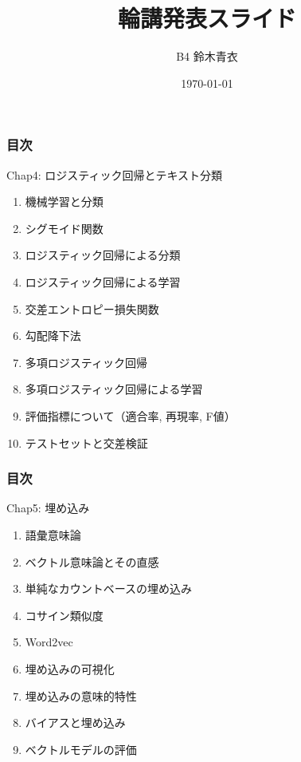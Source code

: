 \documentclass[unicode,11pt]{beamer} %
\title{輪講発表スライド}
\author{B4 鈴木青衣}
\date{\today}
\begin{document}
\begin{frame}
    \maketitle
\end{frame}

\begin{frame}
    \frametitle{目次}
    \begin{block}{Chap4: ロジスティック回帰とテキスト分類}
        \begin{enumerate}
            \item 機械学習と分類
            \item シグモイド関数
            \item ロジスティック回帰による分類
            \item ロジスティック回帰による学習
            \item 交差エントロピー損失関数
            \item 勾配降下法
            \item 多項ロジスティック回帰
            \item 多項ロジスティック回帰による学習
            \item 評価指標について（適合率, 再現率, F値）
            \item テストセットと交差検証
        \end{enumerate}
    \end{block}
\end{frame}

\begin{frame}
    \frametitle{目次}
    \begin{block}{Chap5: 埋め込み}
        \begin{enumerate}
            \item 語彙意味論
            \item ベクトル意味論とその直感
            \item 単純なカウントベースの埋め込み
            \item コサイン類似度
            \item Word2vec
            \item 埋め込みの可視化
            \item 埋め込みの意味的特性
            \item バイアスと埋め込み
            \item ベクトルモデルの評価
        \end{enumerate}
    \end{block}
\end{frame}
\end{document}
